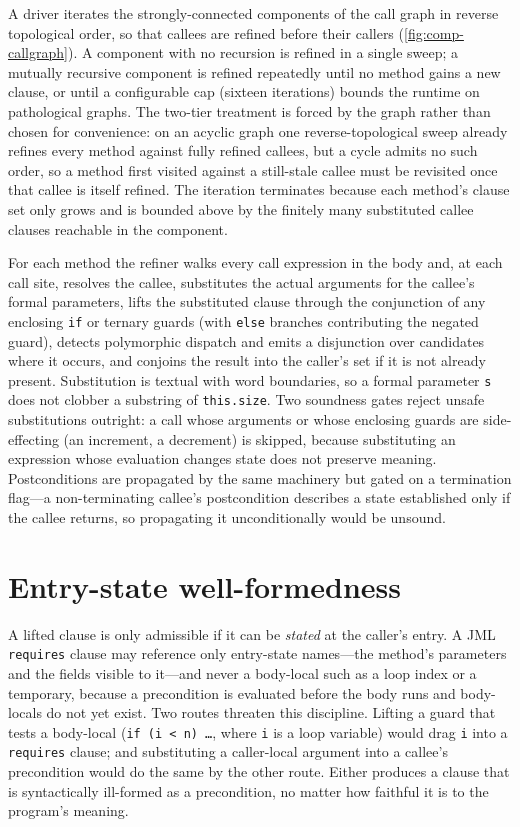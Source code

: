 A driver iterates the strongly-connected components of the call graph in reverse
topological order, so that callees are refined before their callers
(\cref{fig:comp-callgraph}). A component with no recursion is refined in a single
sweep; a mutually recursive component is refined repeatedly until no method gains
a new clause, or until a configurable cap (sixteen iterations) bounds the runtime
on pathological graphs. The two-tier treatment is forced by the graph rather than
chosen for convenience: on an acyclic graph one reverse-topological sweep already
refines every method against fully refined callees, but a cycle admits no such
order, so a method first visited against a still-stale callee must be revisited
once that callee is itself refined. The iteration terminates because each
method's clause set only grows and is bounded above by the finitely many
substituted callee clauses reachable in the component.

For each method the refiner walks every call expression in the body and, at each
call site, resolves the callee, substitutes the actual arguments for the callee's
formal parameters, lifts the substituted clause through the conjunction of any
enclosing \texttt{if} or ternary guards (with \texttt{else} branches
contributing the negated guard), detects polymorphic dispatch and emits a
disjunction over candidates where it occurs, and conjoins the result into the
caller's set if it is not already present. Substitution is textual with word
boundaries, so a formal parameter \texttt{s} does not clobber a substring of
\texttt{this.size}. Two soundness gates reject unsafe substitutions outright:
a call whose arguments or whose enclosing guards are side-effecting (an
increment, a decrement) is skipped, because substituting an expression whose
evaluation changes state does not preserve meaning. Postconditions are propagated
by the same machinery but gated on a termination flag---a non-terminating
callee's postcondition describes a state established only if the callee returns,
so propagating it unconditionally would be unsound.

\section{Entry-state well-formedness}
\label{sec:comp-wellformed}

A lifted clause is only admissible if it can be \emph{stated} at the caller's
entry. A JML \texttt{requires} clause may reference only entry-state names---the
method's parameters and the fields visible to it---and never a body-local such as
a loop index or a temporary, because a precondition is evaluated before the body
runs and body-locals do not yet exist. Two routes threaten this discipline.
Lifting a guard that tests a body-local (\texttt{if (i < n) \dots}, where
\texttt{i} is a loop variable) would drag \texttt{i} into a \texttt{requires}
clause; and substituting a caller-local argument into a callee's precondition
would do the same by the other route. Either produces a clause that is
syntactically ill-formed as a precondition, no matter how faithful it is to the
program's meaning.

